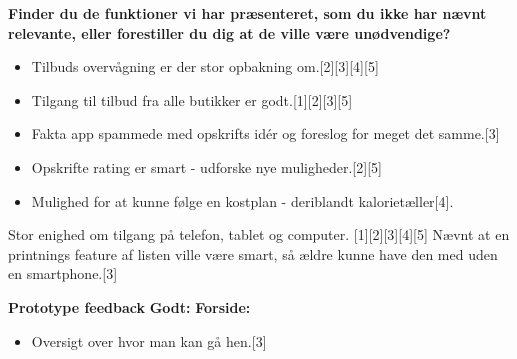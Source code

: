 \textbf{Finder du de funktioner vi har præsenteret, som du ikke har nævnt relevante, eller forestiller du dig at de ville være unødvendige?}
\begin{itemize}
	\item Tilbuds overvågning er der stor opbakning om.{[}2{]}{[}3{]}{[}4{]}{[}5{]}
	\item Tilgang til tilbud fra alle butikker er godt.{[}1{]}{[}2{]}{[}3{]}{[}5{]}
	\item Fakta app spammede med opskrifts idér og foreslog for meget det samme.{[}3{]}
	\item Opskrifte rating er smart - udforske nye muligheder.{[}2{]}{[}5{]}
	\item Mulighed for at kunne følge en kostplan - deriblandt kalorietæller{[}4{]}.
\end{itemize}

Stor enighed om tilgang på telefon, tablet og computer. {[}1{]}{[}2{]}{[}3{]}{[}4{]}{[}5{]}
Nævnt at en printnings feature af listen ville være smart, så ældre kunne have den med uden en smartphone.{[}3{]}

\textbf{Prototype feedback}
\textbf{Godt:}
		\textbf{Forside:}
	\begin{itemize}
		\item Oversigt over hvor man kan gå hen.{[}3{]}
	\end{itemize}

